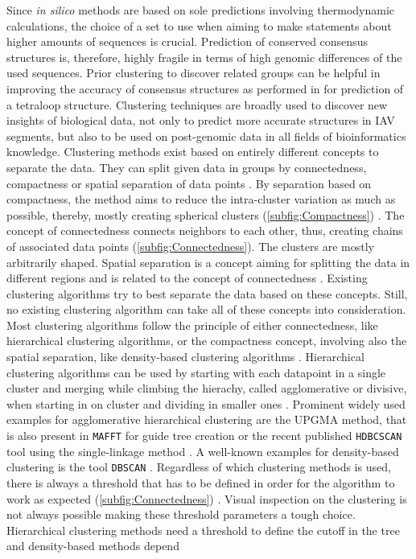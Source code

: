 \vspace{1em}

Since \textit{in silico} methods are based on sole predictions involving thermodynamic calculations, the choice of a set to use when aiming to make statements about higher amounts of sequences is crucial. Prediction of conserved consensus structures is, therefore, highly fragile in terms of high genomic differences of the used sequences. Prior clustering to discover related groups can be helpful in improving the accuracy of consensus structures as performed in \textcite{moss_identification_2011} for prediction of a tetraloop structure. Clustering techniques are broadly used to discover new insights of biological data, not only to predict more accurate structures in \gls{IAV} segments, but also to be used on post-genomic data in all fields of bioinformatics knowledge\autocite{handl_computational_2005}. Clustering methods exist based on entirely different concepts to separate the data. They can split given data in groups by connectedness, compactness or spatial separation of data points \autocite{handl_computational_2005}. By separation based on compactness, the method aims to reduce the intra-cluster variation as much as possible, thereby, mostly creating spherical clusters (\autoref{subfig:Compactness}) \autocite{handl_computational_2005}. The concept of connectedness connects neighbors to each other, thus, creating chains of associated data points (\autoref{subfig:Connectedness}). The clusters are mostly arbitrarily shaped. Spatial separation is a concept aiming for splitting the data in different regions and is related to the concept of connectedness \autocite{handl_computational_2005}. Existing clustering algorithms try to best separate the data based on these concepts. Still, no existing clustering algorithm can take all of these concepts into consideration. Most clustering algorithms follow the principle of either connectedness, like hierarchical clustering algorithms, or the compactness concept, involving also the spatial separation, like density-based clustering algorithms \autocite{handl_computational_2005}. Hierarchical clustering algorithms can be used by starting with each datapoint in a single cluster and merging while climbing the hierachy, called agglomerative or divisive, when starting in on cluster and dividing in smaller ones \autocite{murtagh_algorithms_2012}. Prominent widely used examples for agglomerative hierarchical clustering are the \gls{UPGMA} method, that is also present in \texttt{MAFFT} for guide tree creation or the recent published \texttt{HDBCSCAN} tool using the single-linkage  method \autocite{katoh_mafft_2002, mcinnes_hdbscan_2017}. A well-known examples for density-based clustering is the tool \texttt{DBSCAN} \autocite{madhulatha_overview_2012, schubert_dbscan_2017}. Regardless of which clustering methods is used, there is always a threshold that has to be defined in order for the algorithm to work as expected (\autoref{subfig:Connectedness}) \autocite{madhulatha_overview_2012}. Visual inspection on the clustering is not always possible making these threshold parameters a tough choice. Hierarchical clustering methods need a threshold to define the cutoff in the tree and density-based methods depend 